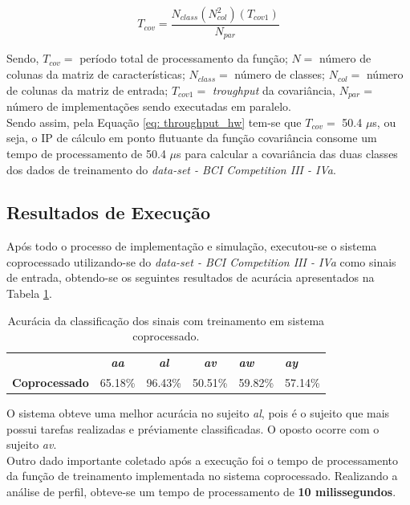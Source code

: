 \begin{equation}
\label{eq: throughput_hw}
T_{cov} = \frac{N_{class}(N_{col}^2)(T_{cov1})}{N_{par}} 
\end{equation}

Sendo, $T_{cov} =$ período total de processamento da função; $N =$ número de colunas da matriz de características; $N_{class} =$ número de classes; $N_{col} =$ número de colunas da matriz de entrada; $T_{cov1} =$ \textit{troughput} da covariância, $N_{par} =$ número de implementações sendo executadas em paralelo.\\
Sendo assim, pela Equação \ref{eq: throughput_hw} tem-se que $T_{cov} =$ 50.4 $\mu$s, ou seja, o IP de cálculo em ponto flutuante da função covariância consome um tempo de processamento de 50.4 $\mu$s para calcular a covariância das duas classes dos dados de treinamento do \textit{data-set - BCI Competition III - IVa}.
\subsection{Resultados de Execução}
Após todo o processo de implementação e simulação, executou-se o sistema coprocessado utilizando-se do \textit{data-set - BCI Competition III - IVa}
como sinais de entrada, obtendo-se os seguintes resultados de acurácia apresentados na Tabela \ref{resacc}.


\begin{table}[!h]
	\label{resacc}
	\caption{Acurácia da classificação dos sinais com treinamento em sistema coprocessado.}
	\centering
	\begin{tabular}{lcccll}
		\rowcolor[HTML]{DAE8FC} 
		\multicolumn{1}{c}{\cellcolor[HTML]{DAE8FC}\textbf{Sistema}} & \textit{\textbf{aa}}        & \textit{\textbf{al}}        & \textit{\textbf{av}}        & \textit{\textbf{aw}} & \textit{\textbf{ay}} \\
		\textbf{Coprocessado}                                        & \multicolumn{1}{r}{65.18\%} & \multicolumn{1}{r}{96.43\%} & \multicolumn{1}{r}{50.51\%} & 59.82\%              & 57.14\%             
	\end{tabular}
\end{table}
O sistema obteve uma melhor acurácia no sujeito \textit{al}, pois é o sujeito que mais possui tarefas realizadas e préviamente classificadas. O oposto ocorre com o sujeito \textit{av}.\\
Outro dado importante coletado após a execução foi o tempo de processamento da função de treinamento implementada no sistema coprocessado. Realizando a análise de perfil, obteve-se um tempo de processamento de \textbf{10 milissegundos}.

